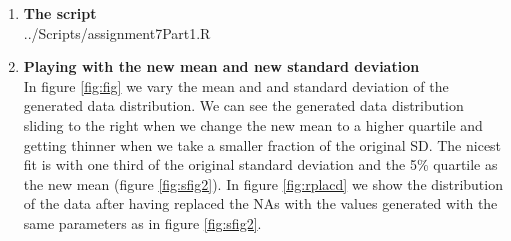 \documentclass[10pt,a4paper]{article}
\begin{document}
\begin{enumerate}

\item \textbf{The script}\\ 
 {../Scripts/assignment7Part1.R}


\item \textbf{Playing with the new mean and new standard deviation}\\

In figure \ref{fig:fig} we vary the mean and and standard deviation of the generated data distribution. We can see the generated data distribution sliding to the right when we change the new mean to a higher quartile and getting thinner when we take a smaller fraction of the original SD. The nicest fit is with one third of the original standard deviation and the 5\% quartile as the new mean (figure \ref{fig:sfig2}). In figure \ref{fig:rplacd} we show the distribution of the data after having replaced the NAs with the values generated with the same parameters as in figure \ref{fig:sfig2}.


\end{enumerate}
\end{document}
